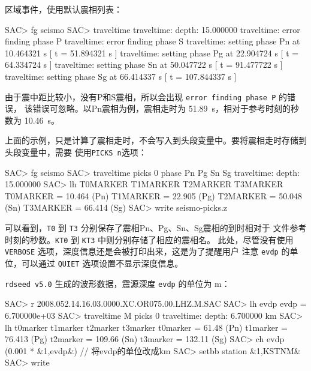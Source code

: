 区域事件，使用默认震相列表：
\begin{SACCode}
SAC> fg seismo
SAC> traveltime
traveltime: depth: 15.000000
traveltime: error finding phase P
traveltime: error finding phase S
traveltime: setting phase Pn       at 10.464321 s [ t = 51.894321 s ]
traveltime: setting phase Pg       at 22.904724 s [ t = 64.334724 s ]
traveltime: setting phase Sn       at 50.047722 s [ t = 91.477722 s ]
traveltime: setting phase Sg       at 66.414337 s [ t = 107.844337 s ]
\end{SACCode}
由于震中距比较小，没有P和S震相，所以会出现 \texttt{error finding phase P} 的错误，
该错误可忽略。以Pn震相为例，震相走时为 \SI{51.89}{\s}，相对于参考时刻的秒数为 \SI{10.46}{\s}。

上面的示例，只是计算了震相走时，不会写入到头段变量中。要将震相走时存储到头段变量中，需要
使用\texttt{PICKS n}选项：
\begin{SACCode}
SAC> fg seismo
SAC> traveltime picks 0 phase Pn Pg Sn Sg
traveltime: depth: 15.000000
SAC> lh T0MARKER T1MARKER T2MARKER T3MARKER
T0MARKER = 10.464           (Pn)
T1MARKER = 22.905           (Pg)
T2MARKER = 50.048           (Sn)
T3MARKER = 66.414           (Sg)
SAC> write seismo-picks.z
\end{SACCode}
可以看到，\texttt{T0} 到 \texttt{T3} 分别保存了震相Pn、Pg、Sn、Sg震相的到时相对于
文件参考时刻的秒数。\texttt{KT0} 到 \texttt{KT3} 中则分别存储了相应的震相名。
此处，尽管没有使用 \texttt{VERBOSE} 选项，深度信息还是会被打印出来，这是为了提醒用户
注意 \texttt{evdp} 的单位，可以通过 \texttt{QUIET} 选项设置不显示深度信息。

\texttt{rdseed v5.0} 生成的波形数据，震源深度 \texttt{evdp} 的单位为 \si{\m}：
\begin{SACCode}
SAC> r 2008.052.14.16.03.0000.XC.OR075.00.LHZ.M.SAC
SAC> lh evdp
evdp = 6.700000e+03
SAC> traveltime M picks 0
traveltime: depth: 6.700000 km
SAC> lh t0marker t1marker t2marker t3marker
t0marker = 61.48            (Pn)
t1marker = 76.413           (Pg)
t2marker = 109.66           (Sn)
t3marker = 132.11           (Sg)
SAC> ch evdp (0.001 * &1,evdp&) // 将evdp的单位改成km
SAC> setbb station &1,KSTNM&
SAC> write %
\end{SACCode}
